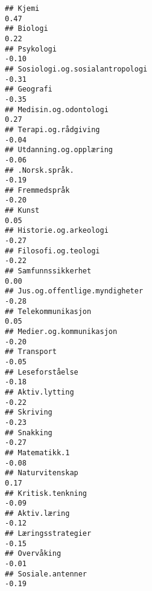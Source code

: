 \documentclass[
]{article}
\begin{document}
\begin{verbatim}
## Kjemi                                                                             0.47
## Biologi                                                                           0.22
## Psykologi                                                                        -0.10
## Sosiologi.og.sosialantropologi                                                   -0.31
## Geografi                                                                         -0.35
## Medisin.og.odontologi                                                             0.27
## Terapi.og.rådgiving                                                              -0.04
## Utdanning.og.opplæring                                                           -0.06
## .Norsk.språk.                                                                    -0.19
## Fremmedspråk                                                                     -0.20
## Kunst                                                                             0.05
## Historie.og.arkeologi                                                            -0.27
## Filosofi.og.teologi                                                              -0.22
## Samfunnssikkerhet                                                                 0.00
## Jus.og.offentlige.myndigheter                                                    -0.28
## Telekommunikasjon                                                                 0.05
## Medier.og.kommunikasjon                                                          -0.20
## Transport                                                                        -0.05
## Leseforståelse                                                                   -0.18
## Aktiv.lytting                                                                    -0.22
## Skriving                                                                         -0.23
## Snakking                                                                         -0.27
## Matematikk.1                                                                     -0.08
## Naturvitenskap                                                                    0.17
## Kritisk.tenkning                                                                 -0.09
## Aktiv.læring                                                                     -0.12
## Læringsstrategier                                                                -0.15
## Overvåking                                                                       -0.01
## Sosiale.antenner                                                                 -0.19

\end{verbatim}
\end{document}
